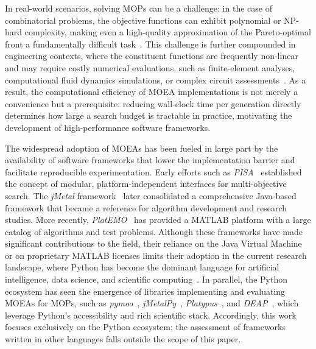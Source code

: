 \documentclass[final,5p,times,twocolumn]{elsarticle}
\begin{document}
In real-world scenarios, solving MOPs can be a challenge: in the case of combinatorial problems, the objective functions can exhibit polynomial or NP-hard complexity, making even a high-quality approximation of the Pareto-optimal front a fundamentally difficult task~\cite{CLV07,deb01}. This challenge is further compounded in engineering contexts, where the constituent functions are frequently non-linear and may require costly numerical evaluations, such as finite-element analyses, computational fluid dynamics simulations, or complex circuit assessments~\cite{ZGM23}. As a result, the computational efficiency of MOEA implementations is not merely a convenience but a prerequisite: reducing wall-clock time per generation directly determines how large a search budget is tractable in practice, motivating the development of high-performance software frameworks.

The widespread adoption of MOEAs has been fueled in large part by the availability of software frameworks that lower the implementation barrier and facilitate reproducible experimentation. Early efforts such as \textit{PISA}~\cite{BLT+03} established the concept of modular, platform-independent interfaces for multi-objective search. The \textit{jMetal} framework~\cite{DN11} later consolidated a comprehensive Java-based framework that became a reference for algorithm development and research studies. More recently, \textit{PlatEMO}~\cite{TCZ+17} has provided a MATLAB platform with a large catalog of algorithms and test problems. Although these frameworks have made significant contributions to the field, their reliance on the Java Virtual Machine or on proprietary MATLAB licenses limits their adoption in the current research landscape, where Python has become the dominant language for artificial intelligence, data science, and scientific computing~\cite{HMV+20}. In parallel, the Python ecosystem has seen the emergence of libraries implementing and evaluating MOEAs for MOPs, such as \textit{pymoo}~\cite{BD20}, \textit{jMetalPy}~\cite{BNG+19}, \textit{Platypus}~\cite{hadka15}, and \textit{DEAP}~\cite{FDG+12}, which leverage Python's accessibility and rich scientific stack. Accordingly, this work focuses exclusively on the Python ecosystem; the assessment of frameworks written in other languages falls outside the scope of this paper. 
\end{document}
